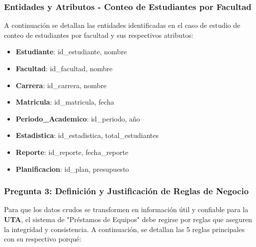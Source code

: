\documentclass{article}
\begin{document}
\subsubsection{Entidades y Atributos - Conteo de Estudiantes por Facultad}

A continuación se detallan las entidades identificadas en el caso de estudio de conteo de estudiantes por facultad y sus respectivos atributos:

\begin{itemize}
    \item \textbf{Estudiante}: id\_estudiante, nombre
    \item \textbf{Facultad}: id\_facultad, nombre
    \item \textbf{Carrera}: id\_carrera, nombre
    \item \textbf{Matricula}: id\_matricula, fecha
    \item \textbf{Periodo\_Academico}: id\_periodo, año
    \item \textbf{Estadistica}: id\_estadistica, total\_estudiantes
    \item \textbf{Reporte}: id\_reporte, fecha\_reporte
    \item \textbf{Planificacion}: id\_plan, presupuesto
\end{itemize}
\subsubsection{Pregunta 3: Definición y Justificación de Reglas de Negocio}

Para que los datos crudos se transformen en información útil y confiable para la \textbf{UTA}, el sistema de "Préstamos de Equipos" debe regirse por reglas que aseguren la integridad y consistencia. A continuación, se detallan las 5 reglas principales con su respectivo porqué:
\end{document}
